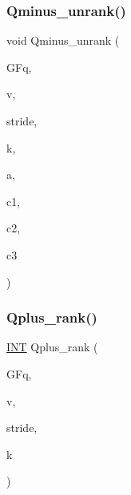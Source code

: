 \subsubsection{\texorpdfstring{Qminus\+\_\+unrank()}{Qminus\_unrank()}}
{\footnotesize\ttfamily void Qminus\+\_\+unrank (\begin{DoxyParamCaption}\item[{\mbox{\hyperlink{classfinite__field}{finite\+\_\+field}} \&}]{G\+Fq,  }\item[{\mbox{\hyperlink{galois_8h_a09fddde158a3a20bd2dcadb609de11dc}{I\+NT}} $\ast$}]{v,  }\item[{\mbox{\hyperlink{galois_8h_a09fddde158a3a20bd2dcadb609de11dc}{I\+NT}}}]{stride,  }\item[{\mbox{\hyperlink{galois_8h_a09fddde158a3a20bd2dcadb609de11dc}{I\+NT}}}]{k,  }\item[{\mbox{\hyperlink{galois_8h_a09fddde158a3a20bd2dcadb609de11dc}{I\+NT}}}]{a,  }\item[{\mbox{\hyperlink{galois_8h_a09fddde158a3a20bd2dcadb609de11dc}{I\+NT}}}]{c1,  }\item[{\mbox{\hyperlink{galois_8h_a09fddde158a3a20bd2dcadb609de11dc}{I\+NT}}}]{c2,  }\item[{\mbox{\hyperlink{galois_8h_a09fddde158a3a20bd2dcadb609de11dc}{I\+NT}}}]{c3 }\end{DoxyParamCaption})}

\mbox{\label{_l_i_b_2_g_a_l_o_i_s_2orthogonal__points_8_c_aaa1be357d007a845ce2866169d63afb7}} 
\subsubsection{\texorpdfstring{Qplus\+\_\+rank()}{Qplus\_rank()}}
{\footnotesize\ttfamily \mbox{\hyperlink{galois_8h_a09fddde158a3a20bd2dcadb609de11dc}{I\+NT}} Qplus\+\_\+rank (\begin{DoxyParamCaption}\item[{\mbox{\hyperlink{classfinite__field}{finite\+\_\+field}} \&}]{G\+Fq,  }\item[{\mbox{\hyperlink{galois_8h_a09fddde158a3a20bd2dcadb609de11dc}{I\+NT}} $\ast$}]{v,  }\item[{\mbox{\hyperlink{galois_8h_a09fddde158a3a20bd2dcadb609de11dc}{I\+NT}}}]{stride,  }\item[{\mbox{\hyperlink{galois_8h_a09fddde158a3a20bd2dcadb609de11dc}{I\+NT}}}]{k }\end{DoxyParamCaption})}

